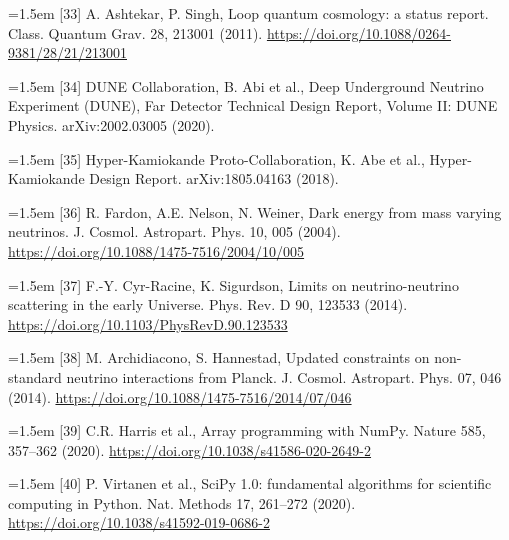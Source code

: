 \documentclass[preprint,12pt]{elsarticle}
\begin{document}
\noindent\hangindent=1.5em [33] A. Ashtekar, P. Singh, Loop quantum cosmology: a status report. Class. Quantum Grav. 28, 213001 (2011). \url{https://doi.org/10.1088/0264-9381/28/21/213001}\par
\noindent\hangindent=1.5em [34] DUNE Collaboration, B. Abi et al., Deep Underground Neutrino Experiment (DUNE), Far Detector Technical Design Report, Volume II: DUNE Physics. arXiv:2002.03005 (2020).\par
\noindent\hangindent=1.5em [35] Hyper-Kamiokande Proto-Collaboration, K. Abe et al., Hyper-Kamiokande Design Report. arXiv:1805.04163 (2018).\par
\noindent\hangindent=1.5em [36] R. Fardon, A.E. Nelson, N. Weiner, Dark energy from mass varying neutrinos. J. Cosmol. Astropart. Phys. 10, 005 (2004). \url{https://doi.org/10.1088/1475-7516/2004/10/005}\par
\noindent\hangindent=1.5em [37] F.-Y. Cyr-Racine, K. Sigurdson, Limits on neutrino-neutrino scattering in the early Universe. Phys. Rev. D 90, 123533 (2014). \url{https://doi.org/10.1103/PhysRevD.90.123533}\par
\noindent\hangindent=1.5em [38] M. Archidiacono, S. Hannestad, Updated constraints on non-standard neutrino interactions from Planck. J. Cosmol. Astropart. Phys. 07, 046 (2014). \url{https://doi.org/10.1088/1475-7516/2014/07/046}\par
\noindent\hangindent=1.5em [39] C.R. Harris et al., Array programming with NumPy. Nature 585, 357--362 (2020). \url{https://doi.org/10.1038/s41586-020-2649-2}\par
\noindent\hangindent=1.5em [40] P. Virtanen et al., SciPy 1.0: fundamental algorithms for scientific computing in Python. Nat. Methods 17, 261--272 (2020). \url{https://doi.org/10.1038/s41592-019-0686-2}\par
\end{document}
